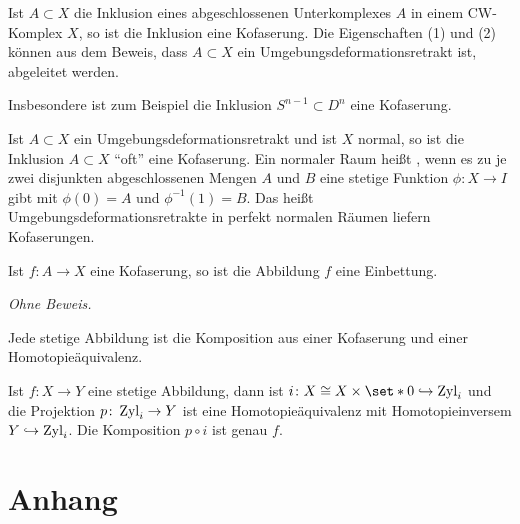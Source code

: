 \begin{beispiel}[{name=[Kofaserung bei CW-Komplexen]}]
	Ist $A \subset X$ die Inklusion eines abgeschlossenen Unterkomplexes $A$ in einem CW-Komplex $X$, so ist die Inklusion eine Kofaserung.
	Die Eigenschaften (1) und (2) können aus dem Beweis, dass $A \subset X$ ein Umgebungsdeformationsretrakt ist, abgeleitet werden.
	
	Insbesondere ist zum Beispiel die Inklusion $S^{n-1} \subset D^n$ eine Kofaserung.
\end{beispiel}

\begin{bemerkung}[{name=[Umgebungsdeformationsretrakte in perfekt normalen Räumen]}]
	Ist $A \subset X$ ein Umgebungsdeformationsretrakt und ist $X$ normal, so ist die Inklusion $A \subset X$ \enquote{oft} eine Kofaserung.
	Ein normaler Raum heißt , wenn es zu je zwei disjunkten abgeschlossenen Mengen $A$ und $B$ eine stetige Funktion $\phi \colon X \to I$ gibt mit $\phi(0) =A$ und $\phi^{-1}(1)=B$.
	Das heißt Umgebungsdeformationsretrakte in perfekt normalen Räumen liefern Kofaserungen.
\end{bemerkung}

\begin{satz}[{name=[Kofaserungen sind Einbettungen]}]
	Ist $f \colon A \to X$ eine Kofaserung, so ist die Abbildung $f$ eine Einbettung.
\end{satz}
\begin{beweis}
	\emph{Ohne Beweis.}
\end{beweis}

\begin{satz}[{name=[stetige Abbildungen als Kofaserung]}]
	Jede stetige Abbildung ist die Komposition aus einer Kofaserung und einer Homotopieäquivalenz.
\end{satz}
\begin{beweis}
	Ist $f \colon X \to Y$ eine stetige Abbildung, dann ist $i \colon X \cong X \times \set*{0} \hookrightarrow \Zyl_i$ und die Projektion $p \colon \operatorname{Zyl}_i \to Y$ ist eine Homotopieäquivalenz mit Homotopieinversem $Y \hookrightarrow \operatorname{Zyl}_i$.
	Die Komposition $p \circ i$ ist genau $f$.
\end{beweis}

\cleardoubleoddemptypage
{}
\setcounter{page}{1}
\cleardoubleoddemptypage
\appendix

\section{Anhang} %
\label{sec:anhang}

\printindex
\printbibliography
\listoffigures
\todototoc
{}

